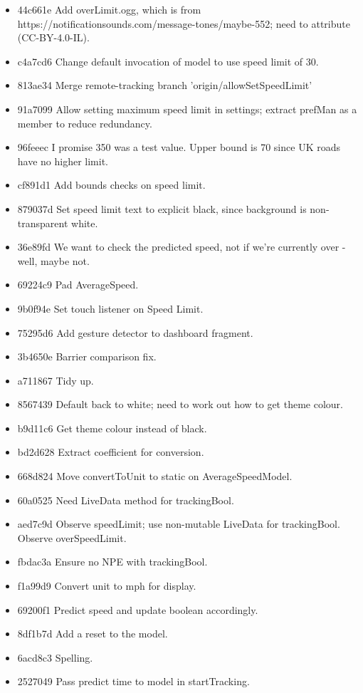 \documentclass[11pt, a4paper, notitlepage]{report}
\begin{document}
\begin{itemize}
	\item 44c661e Add overLimit.ogg, which is from https://notificationsounds.com/message-tones/maybe-552; need to attribute (CC-BY-4.0-IL). 
	\item c4a7cd6 Change default invocation of model to use speed limit of 30. 
	\item 813ae34 Merge remote-tracking branch 'origin/allowSetSpeedLimit' 
	\item 91a7099 Allow setting maximum speed limit in settings; extract prefMan as a member to reduce redundancy. 
	\item 96feeec I promise 350 was a test value. Upper bound is 70 since UK roads have no higher limit. 
	\item cf891d1 Add bounds checks on speed limit. 
	\item 879037d Set speed limit text to explicit black, since background is non-transparent white. 
	\item 36e89fd We want to check the predicted speed, not if we're currently over - well, maybe not. 
	\item 69224c9 Pad AverageSpeed. 
	\item 9b0f94e Set touch listener on Speed Limit. 
	\item 75295d6 Add gesture detector to dashboard fragment. 
	\item 3b4650e Barrier comparison fix. 
	\item a711867 Tidy up. 
	\item 8567439 Default back to white; need to work out how to get theme colour. 
	\item b9d11c6 Get theme colour instead of black. 
	\item bd2d628 Extract coefficient for conversion. 
	\item 668d824 Move convertToUnit to static on AverageSpeedModel. 
	\item 60a0525 Need LiveData method for trackingBool. 
	\item aed7c9d Observe speedLimit; use non-mutable LiveData for trackingBool. Observe overSpeedLimit. 
	\item fbdac3a Ensure no NPE with trackingBool. 
	\item f1a99d9 Convert unit to mph for display. 
	\item 69200f1 Predict speed and update boolean accordingly. 
	\item 8df1b7d Add a reset to the model. 
	\item 6acd8c3 Spelling. 
	\item 2527049 Pass predict time to model in startTracking. 

\end{itemize}
\end{document}
